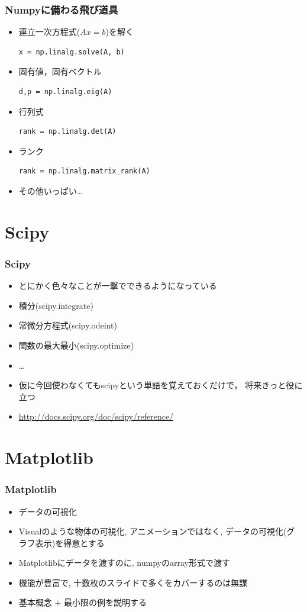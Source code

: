 \documentclass[10pt,dvipdfmx]{beamer}
\begin{document}
\begin{frame}[fragile]
\frametitle{Numpyに備わる飛び道具}
\begin{itemize}
\item 連立一次方程式($Ax=b$)を解く
\begin{lstlisting}
x = np.linalg.solve(A, b)
\end{lstlisting}
\item 固有値，固有ベクトル
\begin{lstlisting}
d,p = np.linalg.eig(A)
\end{lstlisting}
\item 行列式
\begin{lstlisting}
rank = np.linalg.det(A)
\end{lstlisting}
\item ランク
\begin{lstlisting}
rank = np.linalg.matrix_rank(A)
\end{lstlisting}
\item その他いっぱい\ldots
\end{itemize}
\end{frame}

\section{Scipy}
\begin{frame}
\frametitle{Scipy}
\begin{itemize}
\item とにかく色々なことが一撃でできるようになっている
\item 積分(scipy.integrate)
\item 常微分方程式(scipy.odeint)
\item 関数の最大最小(scipy.optimize)
\item \ldots
\item 仮に今回使わなくてもscipyという単語を覚えておくだけで，
  将来きっと役に立つ
\item \url{http://docs.scipy.org/doc/scipy/reference/}
\end{itemize}
\end{frame}


\section{Matplotlib}
\begin{frame}
\frametitle{Matplotlib}
\begin{itemize}
\item データの可視化
\item Visualのような物体の可視化, アニメーションではなく,
データの可視化(グラフ表示)を得意とする
\item Matplotlibにデータを渡すのに, 
  numpyのarray形式で渡す
\item 機能が豊富で, 十数枚のスライドで多くをカバーするのは無謀
\item 基本概念 $+$ 最小限の例を説明する
\end{itemize}
\end{frame}
\end{document}
